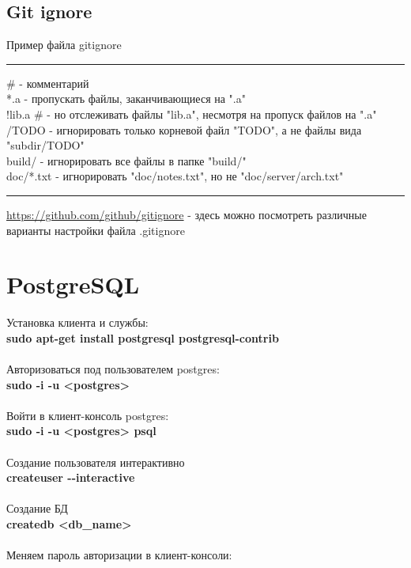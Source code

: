 \documentclass[a4paper, 12px]{article}
\begin{document}
\subsection{Git ignore}

Пример файла gitignore\\
\noindent\rule{\textwidth}{1pt}
\# - комментарий\\
*.a - пропускать файлы, заканчивающиеся на ".a"\\
!lib.a \# - но отслеживать файлы "lib.a", несмотря на пропуск файлов на ".a"\\
/TODO - игнорировать только корневой файл "TODO", а не файлы вида "subdir/TODO"\\
build/ - игнорировать все файлы в папке "build/"\\
doc/*.txt - игнорировать "doc/notes.txt", но не "doc/server/arch.txt"\\
\noindent\rule{\textwidth}{1pt}
\href{https://github.com/github/gitignore}{https://github.com/github/gitignore} - здесь можно посмотреть различные варианты настройки файла .gitignore

\section{PostgreSQL}

Установка клиента и службы: \\

\textbf{sudo apt-get install postgresql postgresql-contrib}\\\\
Авторизоваться под пользователем postgres: \\

\textbf{sudo -i -u <postgres>} \\\\
Войти в клиент-консоль postgres: \\

\textbf{sudo -i -u <postgres> psql}\\\\
Создание пользователя интерактивно \\

\textbf{createuser -\--interactive}  \\\\
Создание БД\\

\textbf{createdb <db\_name>}\\\\
Меняем пароль авторизации в клиент-консоли: \\
\end{document}
